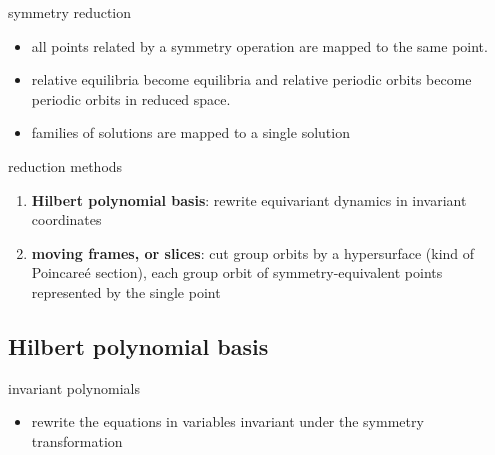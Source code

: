 \documentclass{beamer}
\begin{document}
\begin{frame}{symmetry reduction}
\begin{itemize}
 \item all points related by a symmetry operation are mapped to the same point.
 \item relative equilibria become equilibria and relative periodic orbits become periodic orbits in reduced space.
 \item families of solutions are mapped to a single solution
\end{itemize}
\end{frame}


\begin{frame}{reduction methods}
\begin{enumerate}
	\item  {\bf Hilbert polynomial basis}: rewrite equi\-vari\-ant
dynamics in in\-vari\-ant coordinates
	\item {\bf moving frames, or slices}:
cut group orbits by a hypersurface (kind of
Poincare\'e section), each group orbit of
symmetry-equivalent points represented by the single point
\end{enumerate}
\end{frame}

\subsection{Hilbert polynomial basis}
\begin{frame}{invariant polynomials}
\begin{itemize}
 \item<alert@2-> rewrite the equations in variables invariant
 under the symmetry transformation
\end{itemize}
\end{frame}
\end{document}
